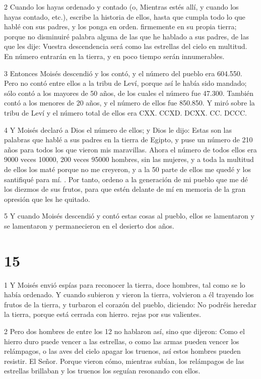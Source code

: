 \par 2 Cuando los hayas ordenado y contado (o, Mientras estés allí, y cuando los hayas contado, etc.), escribe la historia de ellos, hasta que cumpla todo lo que hablé con sus padres, y los ponga en orden. firmemente en su propia tierra; porque no disminuiré palabra alguna de las que he hablado a sus padres, de las que les dije: Vuestra descendencia será como las estrellas del cielo en multitud. En número entrarán en la tierra, y en poco tiempo serán innumerables.

\par 3 Entonces Moisés descendió y los contó, y el número del pueblo era 604.550. Pero no contó entre ellos a la tribu de Leví, porque así le había sido mandado; sólo contó a los mayores de 50 años, de los cuales el número fue 47.300. También contó a los menores de 20 años, y el número de ellos fue 850.850. Y miró sobre la tribu de Leví y el número total de ellos era CXX. CCXD. DCXX. CC. DCCC.

\par 4 Y Moisés declaró a Dios el número de ellos; y Dios le dijo: Estas son las palabras que hablé a sus padres en la tierra de Egipto, y puse un número de 210 años para todos los que vieron mis maravillas. Ahora el número de todos ellos era 9000 veces 10000, 200 veces 95000 hombres, sin las mujeres, y a toda la multitud de ellos los maté porque no me creyeron, y a la 50 parte de ellos me quedé y los santifiqué para mí. . Por tanto, ordeno a la generación de mi pueblo que me dé los diezmos de sus frutos, para que estén delante de mí en memoria de la gran opresión que les he quitado.

\par 5 Y cuando Moisés descendió y contó estas cosas al pueblo, ellos se lamentaron y se lamentaron y permanecieron en el desierto dos años.

\chapter{15}

\par 1 Y Moisés envió espías para reconocer la tierra, doce hombres, tal como se lo había ordenado. Y cuando subieron y vieron la tierra, volvieron a él trayendo los frutos de la tierra, y turbaron el corazón del pueblo, diciendo: No podréis heredar la tierra, porque está cerrada con hierro. rejas por sus valientes.

\par 2 Pero dos hombres de entre los 12 no hablaron así, sino que dijeron: Como el hierro duro puede vencer a las estrellas, o como las armas pueden vencer los relámpagos, o las aves del cielo apagar los truenos, así estos hombres pueden resistir. El Señor. Porque vieron cómo, mientras subían, los relámpagos de las estrellas brillaban y los truenos los seguían resonando con ellos.

